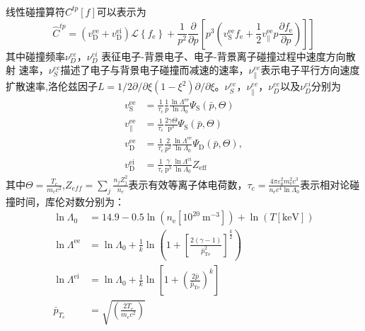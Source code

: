 线性碰撞算符$C ̂^{tp}[f] $可以表示为\cite{RN2025}
\begin{equation}\label{eq:tpfok}
\left.\hat{C}^{t p}=\left(v_{\mathrm{D}}^{\mathrm{ee}}+v_{\mathrm{D}}^{\mathrm{ei}}\right) \mathcal{L}\left\{f_{\mathrm{e}}\right\}+\frac{1}{p^{2}} \frac{\partial}{\partial p}\left[p^{3}\left(v_{\mathrm{S}}^{\mathrm{ee}} f_{\mathrm{e}}+\frac{1}{2} v_{\|}^{\mathrm{ee}} p \frac{\partial f_{\mathrm{e}}}{\partial p}\right)\right]\right]
\end{equation}
其中碰撞频率$\nu_D^{ee}$，$\nu_D^{ei}$ 表征电子-背景电子、电子-背景离子碰撞过程中速度方向散射
速率，$\nu_S^{ee}$描述了电子与背景电子碰撞而减速的速率，$\nu_{∥}^{ee}$表示电子平行方向速度
扩散速率,洛伦兹因子$L=1/2∂/∂ξ(1-ξ^2 )∂/∂ξ$。$\nu_S^{ee}$，$\nu_{∥}^{ee}$，$\nu_D^{ee}$以及$\nu_D^{ei}$分别为
\begin{equation}\label{eq:charnude}
\begin{aligned}
v_{\mathrm{S}}^{\mathrm{ee}} & = \frac{1}{\tau_{\mathrm{c}}} \frac{1}{p} \frac{\ln \Lambda^{\mathrm{ee}}}{\ln \Lambda_{0}} \Psi_{\mathrm{S}}(\bar{p}, \Theta) \\
v_{\|}^{\mathrm{ee}} & = \frac{1}{\tau_{\mathrm{c}}} \frac{2 \gamma \Theta}{\mathrm{p}^{3}} \Psi_{\mathrm{S}}(\bar{p}, \Theta) \\
v_{\mathrm{D}}^{\mathrm{ee}} & = \frac{1}{\tau_{\mathrm{c}}} \frac{2}{p^{2}} \frac{\ln \Lambda^{\mathrm{ee}}}{\ln \Lambda_{0}} \Psi_{\mathrm{D}}(\bar{p}, \Theta), \\
v_{\mathrm{D}}^{\mathrm{ei}} & = \frac{1}{\tau_{\mathrm{c}}} \frac{\gamma}{\mathrm{p}^{3}} \frac{\ln \Lambda^{\mathrm{ei}}}{\ln \Lambda_{0}} Z_{\mathrm{eff}}
\end{aligned}
\end{equation}
其中$\Theta=\frac{T_e}{m_ec^2}$,$Z_{eff}=\sum_j\frac{n_jZ_j^2}{n_e}$表示有效等离子体电荷数，$\tau_{\mathrm{c}}=\frac{4 \pi \varepsilon_{0}^{2} m_{\mathrm{e}}^{2} c^{3}}{n_{\mathrm{e}} e^{4}\ln \Lambda_{0}}$表示相对论碰撞时间，库伦对数分别为：
\begin{subequations}
\begin{align}
\ln \Lambda_{0} & = 14.9-0.5 \ln \left(n_{\mathrm{e}}\left[10^{20} \mathrm{~m}^{-3}\right]\right)+\ln (T[\mathrm{keV}]) \\
\ln \Lambda^{\mathrm{ee}} & = \ln \Lambda_{0}+\frac{1}{k} \ln \left(1+\left[\frac{2(\gamma-1)}{\bar{p}_{\mathrm{Te}}^{2}}\right]^{\frac{k}{2}}\right) \\
\ln \Lambda^{\mathrm{ei}} & = \ln \Lambda_{0}+\frac{1}{k} \ln \left[1+\left(\frac{2 \bar{p}}{\bar{p}_{\mathrm{Te}}}\right)^{k}\right] \\
\bar{p}_{T_{e}} & = \sqrt{\left(\frac{2 T_{e}}{m_{e} c^{2}}\right)}
\end{align}
\end{subequations}
